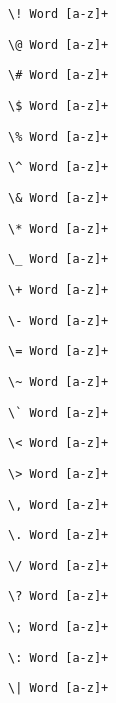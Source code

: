     
    \lstinline{\! Word [a-z]+}
    
    

    
    \lstinline{\@ Word [a-z]+}
    
    

    
    \lstinline{\# Word [a-z]+}
    
    

    
    \lstinline{\$ Word [a-z]+}
    
    

    
    \lstinline{\% Word [a-z]+}
    
    

    
    \lstinline{\^ Word [a-z]+}
    
    

    
    \lstinline{\& Word [a-z]+}
    
    

    
    \lstinline{\* Word [a-z]+}
    
    

    
    \lstinline{\_ Word [a-z]+}
    
    

    
    \lstinline{\+ Word [a-z]+}
    
    

    
    \lstinline{\- Word [a-z]+}
    
    

    
    \lstinline{\= Word [a-z]+}
    
    

    
    \lstinline{\~ Word [a-z]+}
    
    

    
    \lstinline{\` Word [a-z]+}
    
    

    
    \lstinline{\< Word [a-z]+}
    
    

    
    \lstinline{\> Word [a-z]+}
    
    

    
    \lstinline{\, Word [a-z]+}
    
    

    
    \lstinline{\. Word [a-z]+}
    
    

    
    \lstinline{\/ Word [a-z]+}
    
    

    
    \lstinline{\? Word [a-z]+}
    
    

    
    \lstinline{\; Word [a-z]+}
    
    

    
    \lstinline{\: Word [a-z]+}
    
    

    
    \lstinline{\| Word [a-z]+}
    
